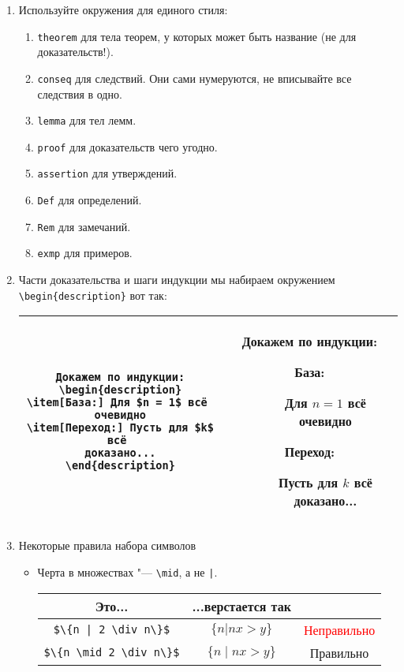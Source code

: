 \documentclass[12pt,a4paper]{book}
\newcounter{theorem}[section]
\newcounter{conseq}[theorem]
\newcommand{\ok}{& \textcolor{green!60!black}{Правильно}}
\newcommand{\bad}{& \textcolor{red}{Неправильно}}
\begin{document}
\begin{enumerate}
\item 
	Используйте окружения для единого стиля:
	\begin{enumerate}
		\item \verb'theorem' для тела теорем, у которых может быть название (не для доказательств!).
		\item \verb'conseq' для следствий. Они сами нумеруются, не вписывайте все следствия в одно.
		\item \verb'lemma' для тел лемм.
		\item \verb'proof' для доказательств чего угодно.
		\item \verb'assertion' для утверждений.
		\item \verb'Def' для определений.
		\item \verb'Rem' для замечаний.
		\item \verb'exmp' для примеров.
	\end{enumerate}

\item 
	Части доказательства и шаги индукции мы набираем окружением \verb'\begin{description}' вот так:
	\begin{center}\begin{tabular}{|c|c|}
		\hline
		\begin{minipage}{8cm}
			\begin{verbatim}
Докажем по индукции:
\begin{description}
\item[База:] Для $n = 1$ всё 
очевидно
\item[Переход:] Пусть для $k$ всё 
доказано...
\end{description}
\end{verbatim}
		\end{minipage}
		&
		\begin{minipage}{7cm}
			Докажем по индукции:
			\begin{description}
				\item[База:] Для $n = 1$ всё очевидно
				\item[Переход:] Пусть для $k$ всё доказано...
			\end{description}
		\end{minipage} \\
		\hline
	\end{tabular}\end{center}

\item
	Некоторые правила набора символов
	\begin{itemize}
	\item 
		Черта в множествах "--- \verb'\mid', а не \verb'|'.
		\begin{center}\begin{tabular}{|c|c|c|}
			\hline Это... & ...верстается так & \\
			\hline \verb'$\{n | 2 \div n\}$' & $\{n | nx > y\}$ \bad \\
			\hline \verb'$\{n \mid 2 \div n\}$' & $\{n \mid nx > y\}$ \ok \\
			\hline
		\end{tabular}\end{center}
	

\end{itemize}
\end{enumerate}
\end{document}
